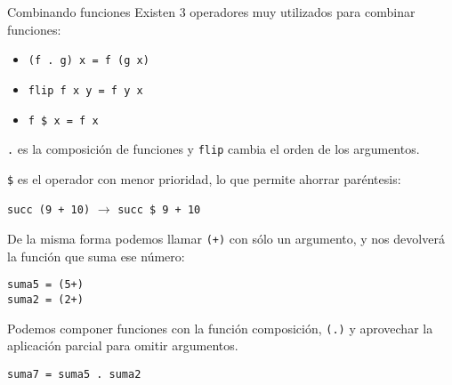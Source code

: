 \begin{extra}{Combinando funciones}
Existen 3 operadores muy utilizados para combinar funciones:

\espacio

\begin{itemize}
  \item \texttt{(f . g) x = f (g x)}
  \item \texttt{flip f x y = f y x}
  \item \texttt{f \$ x = f x}
\end{itemize}

\espacio

\texttt{.} es la composición de funciones y \texttt{flip} cambia el orden de
los argumentos.

\texttt{\$} es el operador con menor prioridad, lo que permite ahorrar paréntesis:

\espacio

\texttt{succ (9 + 10)} $\rightarrow$ \texttt{succ \$ 9 + 10}

\end{extra}
De la misma forma podemos llamar \texttt{(+)} con sólo un argumento, y nos
devolverá la función que suma ese número:

\begin{lstlisting}
suma5 = (5+)
suma2 = (2+)
\end{lstlisting}

Podemos componer funciones con la función composición, \texttt{(.)} y aprovechar
la aplicación parcial para omitir argumentos.

\begin{lstlisting}
suma7 = suma5 . suma2
\end{lstlisting}

\newpage
